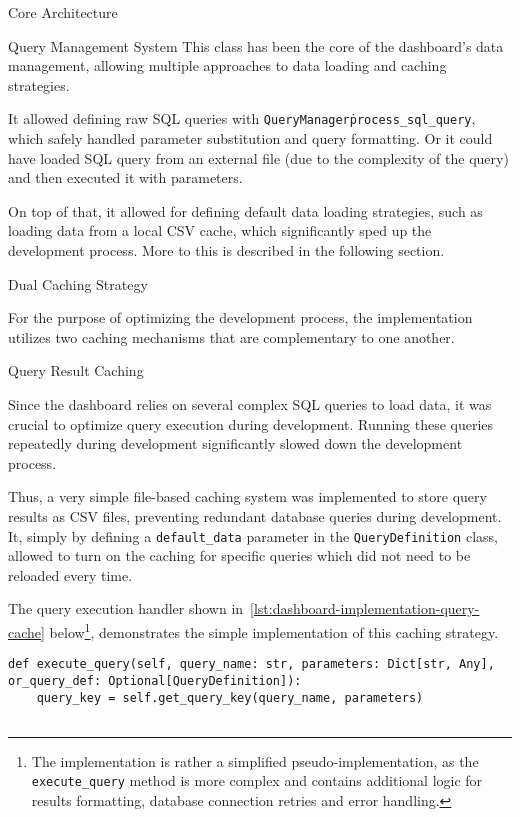 \begin{section}{Core Architecture}
\begin{subsection}{Query Management System}
		This class has been the core of the dashboard's data management, allowing multiple approaches to data loading and caching strategies.

		It allowed defining raw SQL queries with \texttt{QueryManager\.process\_sql\_query}, which safely handled parameter substitution and query formatting.
		Or it could have loaded SQL query from an external file (due to the complexity of the query) and then executed it with parameters.

		On top of that, it allowed for defining default data loading strategies, such as loading data from a local CSV cache, which significantly sped up the development process.
		More to this is described in the following section.
	\end{subsection}

	\begin{subsection}{Dual Caching Strategy}
		\label{subsec:implementation-core-architecture-caching}

		For the purpose of optimizing the development process, the implementation utilizes two caching mechanisms that are complementary to one another.

		\begin{subsubsection}{Query Result Caching}
			\label{subsubsec:implementation-core-architecture-query-cache}

			Since the dashboard relies on several complex SQL queries to load data, it was crucial to optimize query execution during development.
			Running these queries repeatedly during development significantly slowed down the development process.

			Thus, a very simple file-based caching system was implemented to store query results as CSV files, preventing redundant database queries during development.
			It, simply by defining a \texttt{default\_data} parameter in the \texttt{QueryDefinition} class, allowed to turn on the caching for specific queries which did not need to be reloaded every time.

			The query execution handler shown in~\autoref{lst:dashboard-implementation-query-cache} below\footnote{
				The implementation is rather a simplified pseudo-implementation, as the \texttt{execute\_query} method is more complex and contains additional logic for results formatting, database connection retries and error handling.
			}, demonstrates the simple implementation of this caching strategy.

			\begin{listing}[H]
				\caption{Query Result Caching Implementation}
				\begin{verbatim}
def execute_query(self, query_name: str, parameters: Dict[str, Any], or_query_def: Optional[QueryDefinition]):
    query_key = self.get_query_key(query_name, parameters)


\end{verbatim}
\end{listing}
\end{subsubsection}
\end{subsection}
\end{section}
